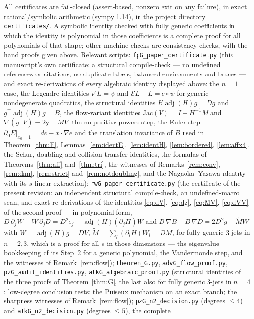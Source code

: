 \documentclass[11pt]{article}
\theoremstyle{plain}
\theoremstyle{definition}
\newcommand{\adj}{\operatorname{adj}}
\newcommand{\Eu}{\mathcal{E}}
\begin{document}
All certificates are fail-closed (assert-based, nonzero exit on any
failure), in exact rational/symbolic arithmetic (sympy 1.14), in the
project directory \texttt{certificates/}. A symbolic identity checked
with fully generic coefficients in which the identity is polynomial in
those coefficients is a complete proof for all polynomials of that
shape; other machine checks are consistency checks, with the hand proofs
given above. Relevant scripts:
\texttt{fpG\_paper\_certificate.py} (this manuscript's own certificate: a
structural compile-check --- no undefined references or citations, no
duplicate labels, balanced environments and braces --- and exact
re-derivations of every algebraic identity displayed above: the
$n=1$ case, the Legendre identities $\nabla L=\psi$ and
$\Eu L-L=e\circ\psi$ for generic nondegenerate quadratics, the
structural identities $H\adj(H)g=Dg$ and $g^{\top}\adj(H)g=B$, the
flow-variant identities $\mathrm{Jac}(V)=I-H^{-1}M$ and
$\nabla(g^{\top}V)=2g-MV$, the no-positive-powers step, the Euler step
$\partial_0E|_{x_0=1}=de-x\cdot\nabla e$ and the translation invariance
of $B$ used in Theorem~\ref{thm:F}, Lemmas~\ref{lem:identE},
\ref{lem:identH}, \ref{lem:bordered}, \ref{lem:affx4}, the Schur,
doubling and collision-transfer identities, the formulas of
Theorems~\ref{thm:aff} and~\ref{thm:tri}, the witnesses of
Remarks~\ref{rem:conv}, \ref{rem:dim}, \ref{rem:strict}
and~\ref{rem:notdoubling}, and the Nagaoka--Yazawa identity with its
$s$-linear extraction); \texttt{rwG\_paper\_certificate.py} (the
certificate of the present revision: an independent structural
compile-check, an undefined-macro scan, and exact re-derivations of the
identities \eqref{eq:dV}, \eqref{eq:dg}, \eqref{eq:MV},
\eqref{eq:dVV} of the second proof --- in polynomial form,
$D\,\partial_jW-W\,\partial_jD=D^2e_j-\adj(H)(\partial_jH)W$ and
$D\,\nabla B-B\,\nabla D=2D^2g-\widetilde MW$ with $W=\adj(H)g=DV$,
$\widetilde M=\sum_l(\partial_lH)W_l=DM$, for fully generic $3$-jets in
$n=2,3$, which is a proof for all $e$ in those dimensions --- the
eigenvalue bookkeeping of its Step~2 for a generic polynomial, the
Vandermonde step, and the witnesses of Remark~\ref{rem:flow});
\texttt{theorem\_G.py}, \texttt{advG\_flow\_proof.py},
\texttt{pzG\_audit\_identities.py}, \texttt{atkG\_algebraic\_proof.py}
(structural identities of the three proofs of Theorem~\ref{thm:G}, the
last also for fully generic $3$-jets in $n=4$; low-degree conclusion
tests; the Puiseux mechanism on an exact branch; the sharpness witnesses
of Remark~\ref{rem:flow}); \texttt{pzG\_n2\_decision.py} (degrees
$\le4$) and \texttt{atkG\_n2\_decision.py} (degrees $\le5$), the complete
\end{document}
